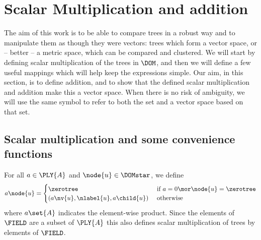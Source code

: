 

\section{Scalar Multiplication and addition}

The aim of this work is to be able to compare trees in a robust way
and to manipulate them as though they were vectors: trees which form
a vector space,  or -- better -- a metric space, which can be compared and
clustered. We will start by defining scalar multiplication of the trees in
$\DOM$, and then we will define a few useful mappings which will help
keep the expressions simple. Our aim, in this section, is to define
addition, and to show that the defined scalar multiplication and
addition make this a vector space. When there is no risk of ambiguity,
we will use the same symbol to refer to both the set and
a vector space based on that set.

\subsection{Scalar multiplication and some convenience functions}
\begin{definition}
  For all \(a \in \PLY{A}\) and \(\node{u} \in \DOMstar\), we
  define
  \begin{align*}
      a \node{u} = \begin{cases}
        \zerotree  & \text{ if } a = 0 \mor \node{u} = \zerotree \\
        (a \nv{u}, \nlabel{u}, a\child{u}) & \text{ otherwise }
      \end{cases}
  \end{align*}
  where $a\set{A}$ indicates the element-wise product.  Since the
  elements of $\FIELD$ are a subset of $\PLY{A}$ this also defines scalar
  multiplication of trees by elements of $\FIELD$.
\end{definition}

